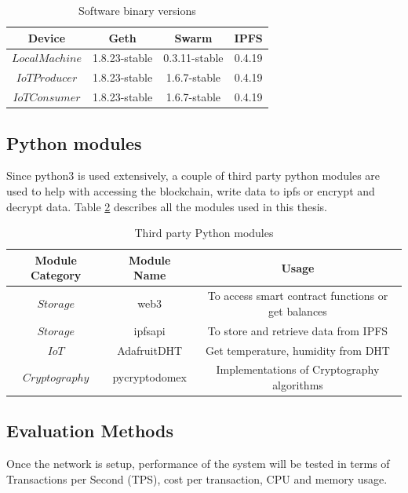 \documentclass[11pt,openright]{report}
\begin{document}
\begin{table}[!htbp]
	\renewcommand{\arraystretch}{1}
	\caption{Software binary versions}
	\label{software_version}
	\centering
	\begin{tabular}{|c|c|c|c|}
		\hline
		\bfseries Device & \bfseries Geth & \bfseries Swarm  & \bfseries IPFS\\
		\hline\hline
		$Local Machine$ & 1.8.23-stable & 0.3.11-stable & 0.4.19 \\ \hline
		$IoT Producer$ & 1.8.23-stable & 1.6.7-stable & 0.4.19 \\ \hline
		$IoT Consumer$ & 1.8.23-stable & 1.6.7-stable & 0.4.19 \\ \hline
	\end{tabular}
\end{table}

\subsection{Python modules}
Since python3 is used extensively, a couple of third party python modules are used to help with accessing the blockchain, write data to ipfs or encrypt and decrypt data. Table \ref{python_modules} describes all the modules used in this thesis.
\begin{table}[!htbp]
	\renewcommand{\arraystretch}{1.3}
	\caption{Third party Python modules}
	\label{python_modules}
	\centering
	\begin{tabular}{|c|c|c|}
		\hline
		\bfseries Module Category & \bfseries Module Name & \bfseries Usage \\
		\hline\hline
		$Storage$ & web3 & To access smart contract functions or get balances \\ \hline
		$Storage$ & ipfsapi & To store and retrieve data from IPFS \\ \hline
		$IoT$ & AdafruitDHT & Get temperature, humidity from DHT \\ \hline
		$Cryptography$ & pycryptodomex & Implementations of Cryptography algorithms \\ \hline
	\end{tabular}
\end{table}



\subsection{Evaluation Methods}
Once the network is setup, performance of the system will be tested in terms of Transactions per Second (TPS), cost per transaction, CPU and memory usage.
\end{document}
